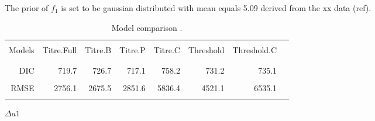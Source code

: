 \documentclass[12pt,a4paper]{article}
\begin{document}
The prior of $f_{1}$ is set to be gaussian distributed with mean equals 5.09 derived from the xx data (ref).  



\begin{table}[ht]
\begin{minipage}{\textwidth}     
\centering %
\caption{Model comparison .}
\centering %
\begin{tabular}{rrrrrrrr}

\hline\hline \\%
Models &       Titre.Full	 &  Titre.B & Titre.P & Titre.C & Threshold & Threshold.C\\ \\
\hline %
\\ 
DIC   &       719.7	 &   726.7  &  717.1 &    758.2 &   731.2 &  735.1\\ \\
RMSE  &       2756.1 &  2675.5  & 2851.6 &   5836.4 &  4521.1 & 6535.1\\ \\
\hline
\end{tabular}
\end{minipage}
\end{table}

$\Delta a1$
\end{document}
